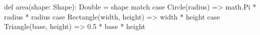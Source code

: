 def area(shape: Shape): Double = shape match {
  case Circle(radius) => math.Pi * radius * radius
  case Rectangle(width, height) => width * height
  case Triangle(base, height) => 0.5 * base * height
}
